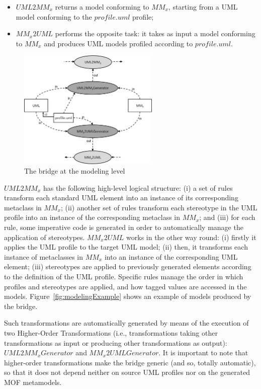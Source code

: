 \begin{itemize}
	\item $UML2MM_x$ returns a model conforming to $MM_x$, starting from a UML model conforming to the $profile.uml$ profile;
	\item $MM_x2UML$ performs the opposite task: it takes as input a model conforming to $MM_x$
	and produces UML models profiled according to $profile.uml$.
\end{itemize}

\begin{figure}[htbp]
	\centering
	\includegraphics[width=0.60\textwidth]{figures/modelingLevel.png}
	\caption{The bridge at the modeling level}
	\label{fig:modelingLevel}
\end{figure}

$UML2MM_x$ has the following high-level logical structure: (i) a set of rules transform each standard UML element into an instance of its corresponding metaclass in $MM_x$; (ii) another set of rules transform each stereotype in the UML profile into an instance of the corresponding metaclass in $MM_x$; and (iii) for each rule, some imperative code is generated in order to automatically manage the application of stereotypes. $MM_x2UML$ works in the other way round: (i) firstly it applies the UML profile to the target UML model; (ii) then, it transforms each instance of metaclasses in $MM_x$ into an instance of the corresponding UML element; (iii) stereotypes are applied to  previously generated elements according to the definition of the UML profile. Specific rules manage the order in which profiles and stereotypes are applied, and how tagged values are accessed in the models. Figure~\ref{fig:modelingExample} shows an example of models produced by the bridge.

Such transformations are automatically generated by means of the execution of two Higher-Order Transformations
(i.e., transformations taking other transformations as input or producing
other transformations as output): $UML2MM_xGenerator$ and $MM_x2UMLGenerator$. It is important to note that higher-order transformations make the bridge generic (and so, totally automatic), so that it does not depend neither on source UML profiles nor on the generated MOF metamodels.

